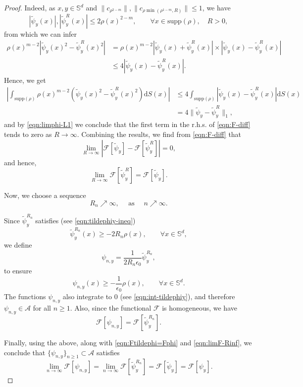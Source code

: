 \documentclass[10pt,a4paper]{amsart}
\newcommand{\bbs}{\mathbb S}
\newcommand{\calF}{\mathcal{F}}
\newcommand{\dm}{d} %
\newcommand{\dx}{\mathrm{d}S (x)}
\newcommand{\supp}{\mathrm{supp}(\rho)}
\begin{document}
\begin{proof}
Indeed, as $x, y\in\bbs^\dm$ and $\|c_{\rho^{2-m}}\|,\|c_{\rho\min(\rho^{1-m},R)}\|\leq1$, we have
\[
|\tilde{\psi}_y(x)|,|\tilde{\psi}_y^R(x)|\leq 2\rho(x)^{2-m}, \qquad\forall x\in\supp,\quad R>0,
\]
from which we can infer
\begin{align*}
\rho(x)^{m-2}\left|\tilde{\psi}_y(x)^2-\tilde{\psi}_y^R(x)^2\right|&=\rho(x)^{m-2}\left|\tilde{\psi}_y(x)+\tilde{\psi}_y^R(x)\right|\times\left|\tilde{\psi}_y(x)-\tilde{\psi}_y^R(x)\right|\\
&\leq4\left|\tilde{\psi}_y(x)-\tilde{\psi}_y^R(x)\right|.
\end{align*}
Hence, we get
\begin{align*}
\left|
\int_{\supp}\rho(x)^{m-2}(\tilde{\psi}_y(x)^2-\tilde{\psi}_y^R(x)^2)\dx\right|& \leq 4\int_{\supp}|\tilde{\psi}_y(x)-\tilde{\psi}_y^R(x)|\dx \\
&=4\|\tilde{\psi}_y-\tilde{\psi}_y^R\|_1,
\end{align*}
and by \eqref{eqn:limphi-L1} we conclude that the first term in the r.h.s. of \eqref{eqn:F-diff} tends to zero as $R\to\infty$. Combining the results, we find from \eqref{eqn:F-diff} that
\[
\lim_{R\to\infty}\left|\mathcal{F}[\tilde{\psi}_y]-\mathcal{F}[\tilde{\psi}_y^R]\right|=0,
\]
and hence,
\begin{equation}
\label{eqn:limF-Rinf}
\lim_{R\to\infty}\mathcal{F}[\tilde{\psi}_y^R]=\mathcal{F}[\tilde{\psi}_y].
\end{equation}

Now, we choose a sequence 
\[
R_n\nearrow\infty,\quad\text{ as }\quad n\nearrow\infty.
\]

Since $\tilde{\psi}_y^{R_n}$ satisfies (see \eqref{eqn:tildephiy-ineq})
\[
\tilde{\psi}_y^{R_n}(x)\geq-2R_n\rho(x),\qquad\forall x\in\bbs^\dm,
\]
we define
\[
\psi_{n, y}=\frac{1}{2R_n\epsilon_0}\tilde{\psi}_y^{R_n},
\]
to ensure
\[
\psi_{n, y}(x)\geq -\frac{1}{\epsilon_0}\rho(x), \qquad\forall x\in\bbs^\dm.
\]
The functions $\psi_{n,y}$ also integrate to $0$ (see \eqref{eqn:int-tildephiy}), and therefore $\psi_{n, y}\in\mathcal{A}$ for all $n \geq 1$. Also, since the functional $\calF$ is homogeneous, we have 
\[
\mathcal{F}[\psi_{n,y}]=\mathcal{F}[\tilde{\psi}_y^{R_n}].
\]

Finally, using the above, along with \eqref{eqn:Ftildephi=Fphi} and \eqref{eqn:limF-Rinf}, we conclude that $\{\psi_{n, y}\}_{n\geq1}\subset\mathcal{A}$ satisfies 
\[
\lim_{n\to\infty}\mathcal{F}[\psi_{n, y}]= \lim_{n\to\infty}\mathcal{F}[\tilde{\psi}_y^{R_n}] = \mathcal{F}[\tilde{\psi}_y]=\mathcal{F}[\psi_y].
\]
\end{proof}
\end{document}
